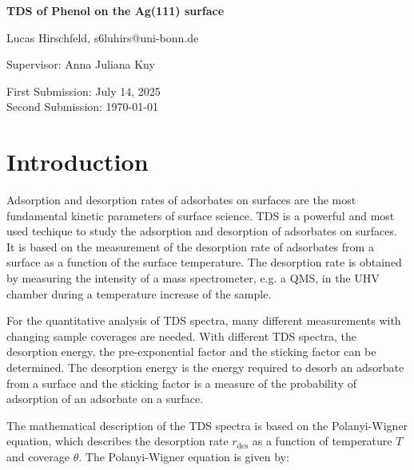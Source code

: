 \documentclass[fontsize=11pt,reqno,a4paper,oneside]{scrartcl}
\makeatletter
\def\Autor{Lucas Hirschfeld, s6luhirs@uni-bonn.de}
\def\Titel{\Acf{TDS} of Phenol on the Ag(111) surface}
\def\Date{First Submission: July 14, 2025 \\Second Submission: \today}
\def\PiC{Supervisor: Anna Juliana Kny}
\def\Abstract{}
\makeatother
\begin{document}
\pagestyle{empty}
\begin{titlepage}
    \begin{center}
        \vspace*{\fill}
        {\LARGE\bfseries \Titel}\par\vspace{2cm}
        {\Autor\par\vspace{0.5cm}\PiC\par\vspace{1cm}\par\vspace{0.2cm}\Date\par\vspace{5cm}}
    \end{center}
    {\Abstract\vspace{0.5cm}\par}\vfill
\end{titlepage}

\pagestyle{scrheadings}
\tableofcontents
{}
\clearpage

\section{Introduction}

Adsorption and desorption rates of adsorbates on surfaces are the most fundamental kinetic parameters of surface science. \Acf{TDS} is a powerful and most used techique to study the adsorption and desorption of adsorbates on surfaces.\autocite{Yates2015} It is based on the measurement of the desorption rate of adsorbates from a surface as a function of the surface temperature. The desorption rate is obtained by measuring the intensity of a mass spectrometer, e.g. a \ac{QMS}, in the \ac{UHV} chamber during a temperature increase of the sample.\autocite{Kolasinski2012}

For the quantitative analysis of \ac{TDS} spectra, many different measurements with changing sample coverages are needed. With different \ac{TDS} spectra, the desorption energy, the pre-exponential factor and the sticking factor can be determined. The desorption energy is the energy required to desorb an adsorbate from a surface and the sticking factor is a measure of the probability of adsorption of an adsorbate on a surface.

The mathematical description of the \ac{TDS} spectra is based on the Polanyi-Wigner equation\autocite{Kolasinski2012}, which describes the desorption rate $r_\mathrm{des}$ as a function of temperature $T$ and coverage $\theta$. The Polanyi-Wigner equation is given by:
\end{document}
